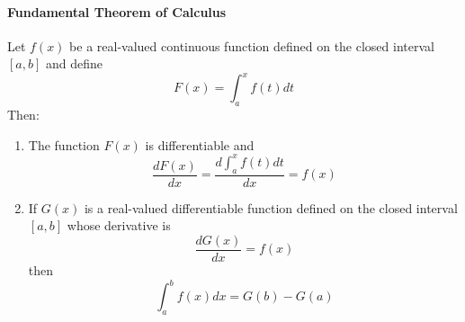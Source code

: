 \documentclass[10pt,a4paper]{article}
\begin{document}
\paragraph{Fundamental Theorem of Calculus} Let $f(x)$ be a real-valued continuous function defined on the closed interval $[a,b]$ and define
$$ F(x) = \int_a^x f(t)dt$$
Then:
\begin{enumerate}
\item The function $F(x)$ is differentiable and 
$$ \frac{dF(x)}{dx} = \frac{d\int_a^xf(t)dt}{dx} = f(x)$$
\item If $G(x)$ is a real-valued differentiable function defined on the closed interval $[a,b]$ whose derivative is
$$ \frac{dG(x)}{dx} = f(x)$$
then
$$ \int_a^b f(x)dx = G(b) - G(a)$$
\end{enumerate}
\end{document}

